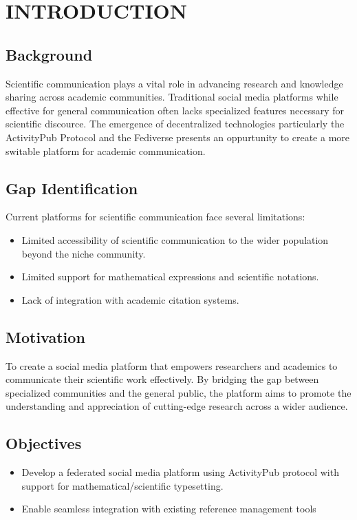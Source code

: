 \chapter{INTRODUCTION}
\section{Background}
Scientific communication plays a vital role in advancing research and knowledge sharing across academic communities. Traditional social media platforms while effective for general communication often lacks specialized features necessary for scientific discource. The emergence of decentralized technologies particularly the ActivityPub \cite{ActivityPub} Protocol and the Fediverse presents an oppurtunity to create a more switable platform for academic communication. 

\section{Gap Identification}
Current platforms for scientific communication face several limitations:

\begin{itemize}
  \item Limited accessibility of scientific communication to the wider population beyond the niche community.
  \item Limited support for mathematical expressions and scientific notations.
  \item Lack of integration with academic citation systems.
\end{itemize}

\section{Motivation}
To create a social media platform that empowers researchers and academics to communicate their scientific work effectively. By bridging the gap between specialized communities and the general public, the platform aims to promote the understanding and appreciation of cutting-edge research across a wider audience.

\section{Objectives}
\begin{itemize}
  \item Develop a federated social media platform using ActivityPub protocol with support for mathematical/scientific typesetting.
  \item Enable seamless integration with existing reference management tools
\end{itemize}
